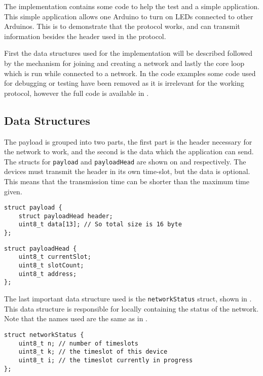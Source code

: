 \noindent
The implementation contains some code to help the test and a simple application. 
This simple application allows one Arduino to turn on LEDs connected to other Arduinos. 
This is to demonstrate that the protocol works, and can transmit information besides the header used in the protocol. 

First the data structures used for the implementation will be described followed by the mechanism for joining and creating a network and lastly the core loop which is run while connected to a network.
In the code examples some code used for debugging or testing have been removed as it is irrelevant for the working protocol, however the full code is available in . 
\subsection{Data Structures}
The payload is grouped into two parts, the first part is the header necessary for the network to work, and the second is the data which the application can send.
The structs for \texttt{payload} and \texttt{payloadHead} are shown on  and  respectively.
The devices must transmit the header in its own time-slot, but the data is optional.
This means that the transmission time can be shorter than the maximum time given.

\begin{lstlisting}[style=customc,caption={The payload the network uses.},label={lst:ccrc:payload}]
struct payload {
    struct payloadHead header;
    uint8_t data[13]; // So total size is 16 byte
};
\end{lstlisting}

\begin{lstlisting}[style=customc,caption={The header of the payload which the network uses.},label={lst:ccrc:payloadHead}]
struct payloadHead {
    uint8_t currentSlot;
    uint8_t slotCount;
    uint8_t address;
};
\end{lstlisting}

\noindent
The last important data structure used is the \texttt{networkStatus} struct, shown in .
This data structure is responsible for locally containing the status of the network. 
Note that the names used are the same as in .

\begin{lstlisting}[style=customc,caption={The \texttt{networkStatus} struct, containing the status of the network locally.},label={lst:ccrc:networkStatus}]
struct networkStatus {
    uint8_t n; // number of timeslots
    uint8_t k; // the timeslot of this device
    uint8_t i; // the timeslot currently in progress
};
\end{lstlisting}


